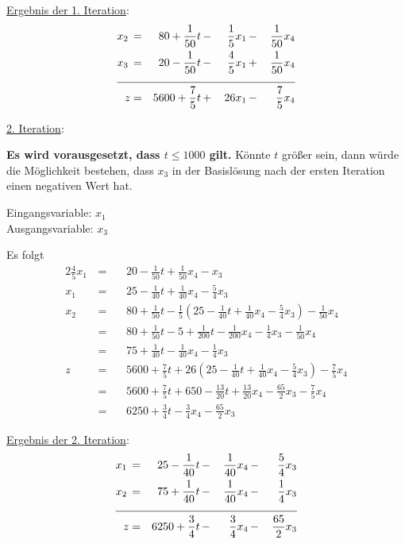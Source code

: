 \documentclass[10pt,a4paper,oneside,ngerman,numbers=noenddot]{scrartcl}
\begin{document}
			\underline{Ergebnis der 1. Iteration}:
			\begin{alignat*}{4}
				x_{2} \,&=&\, 80 + \frac{1}{50}t \,&-&\, \frac{1}{5}x_{1} \,&-&\, \frac{1}{50}x_{4} \\
				x_{3} \,&=&\, 20 - \frac{1}{50}t \,&-&\, \frac{4}{5}x_{1} \,&+&\, \frac{1}{50}x_{4} \\ \cline{1 - 7}
				z &=& 5600 + \frac{7}{5}t \,&+&\, 26x_{1} \,&-&\, \frac{7}{5}x_{4}
			\end{alignat*}
			
			\underline{2. Iteration}:
			
			\textbf{Es wird vorausgesetzt, dass $t \leq 1000$ gilt.} Könnte $t$ größer sein, dann würde die Möglichkeit bestehen, dass $x_{3}$ in der Basislösung nach der ersten Iteration einen negativen Wert hat.
		
			Eingangsvariable: $x_{1}$\\
			Ausgangsvariable: $x_{3}$
		
			Es folgt
			\begin{alignat*}{2}
				\frac{4}{5}x_{1} \,&=&&\, 20 - \frac{1}{50}t +  \frac{1}{50}x_{4} - x_{3} \\
				x_{1} \,&=&&\, 25 - \frac{1}{40}t + \frac{1}{40}x_{4} - \frac{5}{4}x_{3} \\
				x_{2} \,&=&&\, 80 + \frac{1}{50}t - \frac{1}{5}\left(25 - \frac{1}{40}t + \frac{1}{40}x_{4} - \frac{5}{4}x_{3}\right) - \frac{1}{50}x_{4} \\
				&=&&\, 80 + \frac{1}{50}t - 5 + \frac{1}{200}t - \frac{1}{200}x_{4} - \frac{1}{4}x_{3} - \frac{1}{50}x_{4} \\
				&=&&\, 75 + \frac{1}{40}t - \frac{1}{40}x_{4} - \frac{1}{4}x_{3} \\
				z \,&=&&\, 5600 + \frac{7}{5}t + 26\left(25 - \frac{1}{40}t + \frac{1}{40}x_{4} - \frac{5}{4}x_{3}\right) - \frac{7}{5}x_{4} \\
				&=&&\, 5600 + \frac{7}{5}t + 650 - \frac{13}{20}t + \frac{13}{20}x_{4} - \frac{65}{2}x_{3} - \frac{7}{5}x_{4} \\
				&=&&\, 6250 + \frac{3}{4}t - \frac{3}{4}x_{4} - \frac{65}{2}x_{3}
			\end{alignat*}
		
			\underline{Ergebnis der 2. Iteration}:
			\begin{alignat*}{4}
				x_{1} \,&=&\, 25 - \frac{1}{40}t \,&-&\, \frac{1}{40}x_{4} \,&-&\, \frac{5}{4}x_{3} \\
				x_{2} \,&=&\, 75 + \frac{1}{40}t \,&-&\, \frac{1}{40}x_{4} \,&-&\, \frac{1}{4}x_{3} \\ \cline{1 - 7}
				z &=& 6250 + \frac{3}{4}t \,&-&\, \frac{3}{4}x_{4} \,&-&\, \frac{65}{2}x_{3}
			\end{alignat*}
			
\end{document}

